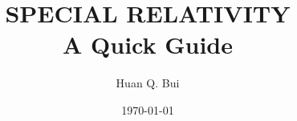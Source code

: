 \documentclass[a4paper,11pt]{article}
\numberwithin{equation}{section}
\begin{document}
\begin{titlepage}\centering
 \clearpage
 \title{\textsc{\bf{SPECIAL RELATIVITY}}\\\smallskip A Quick Guide\\}
 \author{\bigskip Huan Q. Bui}
 \date{\today}
 \maketitle
 \thispagestyle{empty}
\end{titlepage}

%
 
 
 
% 
%
 
\end{document}
